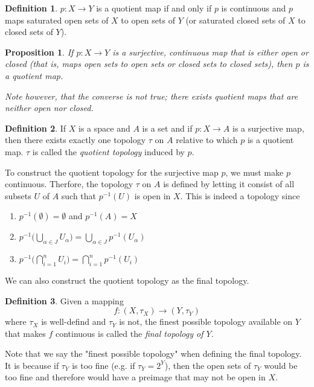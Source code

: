 \documentclass{article}
\newtheorem{proposition}[theorem]{Proposition}
\theoremstyle{remark}
\theoremstyle{definition}
\newtheorem{definition}{Definition}[section]
\begin{document}
\begin{definition}
$p: X \longrightarrow Y$ is a quotient map if and only if $p$ is continuous and $p$ maps saturated open sets of $X$ to open sets of $Y$ (or saturated closed sets of $X$ to closed sets of $Y$). 
\end{definition}

\begin{proposition}
If $p: X \longrightarrow Y$ is a surjective, continuous map that is either open or closed (that is, maps open sets to open sets or closed sets to closed sets), then $p$ is a quotient map. 

Note however, that the converse is not true; there exists quotient maps that are neither open nor closed. 
\end{proposition}

\begin{definition}
If $X$ is a space and $A$ is a set and if $p: X \longrightarrow A$ is a surjective map, then there exists exactly one topology $\tau$ on $A$ relative to which $p$ is a quotient map. $\tau$ is called the \textit{quotient topology} induced by $p$. 
\end{definition}

To construct the quotient topology for the surjective map $p$, we must make $p$ continuous. Therfore, the topology $\tau$ on $A$ is defined by letting it consist of all subsets $U$ of $A$ such that $p^{-1}(U)$ is open in $X$. This is indeed a topology since
\begin{enumerate}
    \item $p^{-1} (\emptyset) = \emptyset$ and $p^{-1}(A) = X$
    \item $p^{-1} \Big( \bigcup_{\alpha \in J} U_\alpha \Big) = \bigcup_{\alpha \in J} p^{-1} (U_\alpha)$
    \item $p^{-1} \Big( \bigcap_{i=1}^n U_i \Big) = \bigcap_{i=1}^n p^{-1} (U_i)$
\end{enumerate}

We can also construct the quotient topology as the final topology. 

\begin{definition}
Given a mapping 
\[f: (X, \tau_X) \longrightarrow (Y, \tau_Y)\]
where $\tau_X$ is well-defind and $\tau_Y$ is not, the finest possible topology available on $Y$ that makes $f$ continuous is called the \textit{final topology of $Y$}. 
\end{definition}

Note that we say the "finest possible topology" when defining the final topology. It is because if $\tau_Y$ is too fine (e.g. if $\tau_Y = 2^Y$), then the open sets of $\tau_Y$ would be too fine and therefore would have a preimage that may not be open in $X$. 
\end{document}
